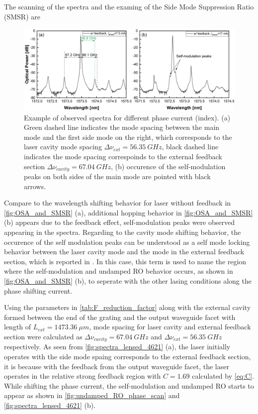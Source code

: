 The scanning of the spectra and the examing of the Side Mode Suppression Ratio (SMSR) are 
\begin{figure}[H]
    \centering
    \includegraphics[width=\linewidth]{figures/spectra_lensed_4621.png}
    \caption{Example of observed spectra for different phase current (index). (a) Green dashed line indicates the mode spacing between the main mode and the first side mode on the right, which corresponds to the laser cavity mode spacing $\Delta\nu_{ext}=56.35 \ GHz$, black dashed line indicates the mode spacing correspoinds to the external feedback section $\Delta\nu_{cavity}=67.04 \ GHz$, (b) occurence of the self-modulation peaks on both sides of the main mode are pointed with black arrows.}
    \label{fig:spectra_lensed_4621}
\end{figure}

Compare to the wavelength shifting behavior for laser without feedback in \autoref{fig:OSA_and_SMSR} (a), additional hopping behavior in \autoref{fig:OSA_and_SMSR} (b) appears due to the feedback effect, self-modulation peaks were observed appearing in the spectra. Regarding to the cavity mode shifting behavior, the occurence of the self modulation peaks can be understood as a self mode locking behavior between the laser cavity mode and the mode in the external feedback section, which is reported in \cite{tager1994high}. In this case, this term is used to name the region where the self-modulation and undamped RO behavior occurs, as shown in \autoref{fig:OSA_and_SMSR} (b), to seperate with the other lasing conditions along the phase shifting current.

Using the parameters in \autoref{tab:F_reduction_factor} along with the external cavity formed between the end of the grating and the output waveguide facet with length of $L_{ext}=1473.36 \ \mu m$, mode spacing for laser cavity and external feedback section were calculated as $\Delta\nu_{cavity}=67.04 \ GHz$ and $\Delta\nu_{ext}=56.35 \ GHz$ respectively. As seen from \autoref{fig:spectra_lensed_4621} (a), the laser initially operates with the side mode spaing corresponds to the external feedback section, it is because with the feedback from the output waveguide facet, the laser operates in the relative strong feedback region with $C=1.69$ calculated by \autoref{eq:C}. While shifting the phase current, the self-modulation and undamped RO starts to appear as shown in \autoref{fig:undamped_RO_phase_scan} and \autoref{fig:spectra_lensed_4621} (b).

